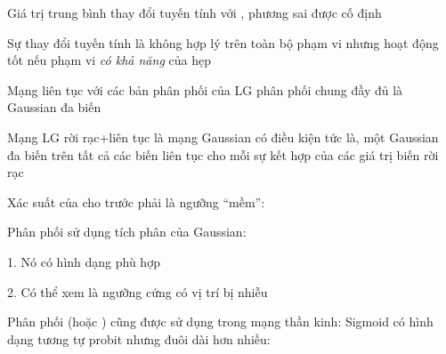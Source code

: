\documentclass{article}
\begin{document}
\begin{huge}
Giá trị trung bình  thay đổi tuyến tính với , phương sai được cố định

Sự thay đổi tuyến tính là không hợp lý trên toàn bộ phạm vi \al
  nhưng hoạt động tốt nếu phạm vi \emph{có khả năng} của  hẹp


\vspace*{-0.4in}

\textwidth
{}

\vspace*{-0.4in}

Mạng liên tục với các bản phân phối của LG\al
  \mat{$\implies$} phân phối chung đầy đủ là Gaussian đa biến \al

Mạng LG rời rạc+liên tục là mạng Gaussian có điều kiện 
tức là, một Gaussian đa biến trên tất cả các biến liên tục
cho mỗi sự kết hợp của các giá trị biến rời rạc







Xác suất của  cho trước  phải là ngưỡng ``mềm'':

\textwidth
{}

Phân phối  sử dụng tích phân của Gaussian:\al
  \al
  \\


1. Nó có hình dạng phù hợp

2. Có thể xem là ngưỡng cứng có vị trí bị nhiễu

\textwidth
{}





Phân phối  (hoặc ) cũng được sử dụng trong mạng thần kinh:
\mat{\[
P(Buys?\eq true \given Cost \eq c) = \frac{1}{1+exp(-2\frac{-c+\mu}{\sigma})}
\]}
Sigmoid có hình dạng tương tự probit nhưng đuôi dài hơn nhiều:


\end{huge}
\end{document}
